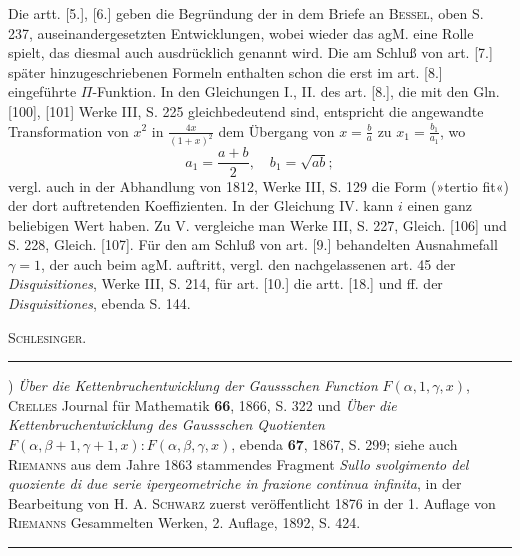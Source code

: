 \indent Die artt. [5.], [6.] geben die Begründung der in dem Briefe an \textsc{Bessel}, oben S. 237, auseinandergesetzten Entwicklungen, wobei wieder das agM. eine Rolle spielt, das diesmal auch ausdrücklich genannt wird.
Die am Schluß von art. [7.] später hinzugeschriebenen Formeln enthalten schon die erst im art. [8.] eingeführte $\Pi$-Funktion.
In den Gleichungen I., II. des art. [8.], die mit den Gln. [100], [101] Werke III, S. 225 gleichbedeutend sind, entspricht die angewandte Transformation von $x^2$ in $\frac{4x}{(1+x)^2}$ dem Übergang von $x=\frac ba$ zu $x_1=\frac{b_1}{a_1}$, wo
\[
a_1=\frac{a+b}{2},\quad b_1=\sqrt{ab};
\]
\noindent vergl. auch in der Abhandlung von 1812, Werke III, S. 129 die  Form (»tertio fit«) der dort auftretenden Koeffizienten.
In der Gleichung IV. kann $i$ einen ganz beliebigen Wert haben.
Zu V. vergleiche man Werke III, S. 227, Gleich. [106] und S. 228, Gleich. [107].
Für den am Schluß von art. [9.] behandelten Ausnahmefall $\gamma=1$, der auch beim agM. auftritt, vergl. den nachgelassenen art. 45 der \emph{Disquisitiones}, Werke III, S. 214, für art. [10.] die artt. [18.] und ff. der \emph{Disquisitiones}, ebenda S. 144.
\par\hfill\textsc{Schlesinger.}\par
\medskip\noindent\rule{.25\linewidth}{.4pt}\par\smallskip
{\small\noindent *) \emph{Über die Kettenbruchentwicklung der Gaussschen Function} $F(\alpha,1,\gamma,x)$, \textsc{Crelles} Journal für Mathematik \textbf{66}, 1866, S. 322 und \emph{Über die Kettenbruchentwicklung des Gaussschen Quotienten} $F(\alpha,\beta+1,\gamma+1,x):F(\alpha,\beta,\gamma,x)$, ebenda \textbf{67}, 1867, S. 299; siehe auch \textsc{Riemanns} aus dem Jahre 1863 stammendes Fragment \emph{Sullo svolgimento del quoziente di due serie ipergeometriche in frazione continua infinita}, in der Bearbeitung von H. A. \textsc{Schwarz} zuerst veröffentlicht 1876 in der 1. Auflage von \textsc{Riemanns} Gesammelten Werken, 2. Auflage, 1892, S. 424.\par}
\begin{center}\rule{.25\textwidth}{.4pt}\end{center}
\clearpage
